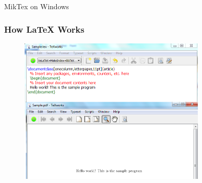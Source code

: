 \documentclass [9pt] {beamer}
\begin{document}
\begin{frame}{MikTex on Windows}%
\begin{figure}
\end{figure}
\end{frame}















\begin{frame}\frametitle{How LaTeX Works}
\rm
\begin{figure}[h!]
\begin{center}
     \includegraphics[width=0.8\textwidth]{home} \\
\end{center}
\end{figure}
\end{frame}
\end{document}
